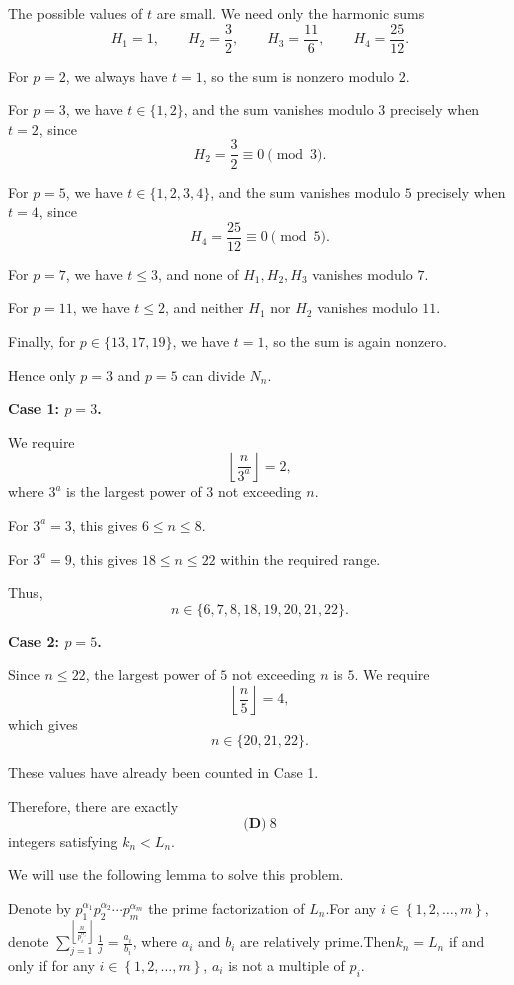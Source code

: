 \begin{enumerate}
 The possible values of $t$ are small. We need only the harmonic sums
 \[H_1=1,\qquad H_2=\frac32,\qquad H_3=\frac{11}{6},\qquad H_4=\frac{25}{12}.\]

 For $p=2$, we always have $t=1$, so the sum is nonzero modulo $2$.

 For $p=3$, we have $t\in\{1,2\}$, and the sum vanishes modulo $3$ precisely when $t=2$, since
 \[H_2=\frac32\equiv0\pmod3.\]

 For $p=5$, we have $t\in\{1,2,3,4\}$, and the sum vanishes modulo $5$ precisely when $t=4$, since
 \[H_4=\frac{25}{12}\equiv0\pmod5.\]

 For $p=7$, we have $t\le3$, and none of $H_1,H_2,H_3$ vanishes modulo $7$.

 For $p=11$, we have $t\le2$, and neither $H_1$ nor $H_2$ vanishes modulo $11$.

 Finally, for $p\in\{13,17,19\}$, we have $t=1$, so the sum is again nonzero.

 Hence only $p=3$ and $p=5$ can divide $N_n$.

 \textbf{Case 1: $p=3$.}

 We require
 \[\left\lfloor\frac{n}{3^a}\right\rfloor=2,\]where $3^a$ is the largest power of $3$ not exceeding $n$.

 For $3^a=3$, this gives $6\le n\le8$.

 For $3^a=9$, this gives $18\le n\le22$ within the required range.

 Thus,
 \[n\in\{6,7,8,18,19,20,21,22\}.\]

 \textbf{Case 2: $p=5$.}

 Since $n\le22$, the largest power of $5$ not exceeding $n$ is $5$. We require
 \[\left\lfloor\frac n5\right\rfloor=4,\]which gives
 \[n\in\{20,21,22\}.\]

 These values have already been counted in Case 1.

 Therefore, there are exactly
 \[\boxed{\textbf{(D)}\ 8}\]integers satisfying $k_n<L_n$.

 


 We will use the following lemma to solve this problem.

 Denote by $p_1^{\alpha_1} p_2^{\alpha_2} \cdots p_m^{\alpha_m}$ the prime factorization of $L_n$.For any $i \in \left\{ 1, 2, \ldots, m \right\}$, denote $\sum_{j = 1}^{\left\lfloor \frac{n}{p_i^{\alpha_i}} \right\rfloor} \frac{1}{j} = \frac{a_i}{b_i}$, where $a_i$ and $b_i$ are relatively prime.Then$k_n = L_n$ if and only if for any $i \in \left\{ 1, 2, \ldots, m \right\}$, $a_i$ is not a multiple of $p_i$.


\end{enumerate}
